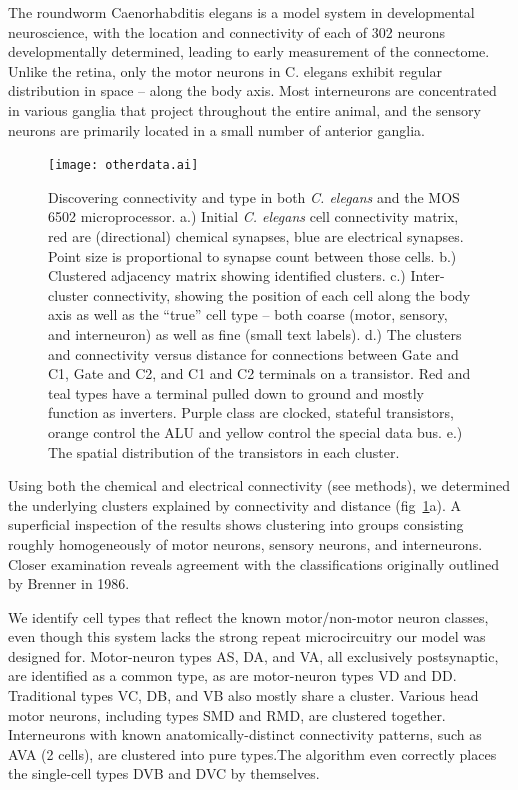 \documentclass{article}
\begin{document}
The roundworm Caenorhabditis elegans is a model system in
developmental neuroscience\autocite{White1986}, with the location and
connectivity of each of 302 neurons developmentally determined,
leading to early measurement of the connectome. Unlike the retina,
only the motor neurons in C. elegans exhibit regular distribution in
space -- along the body axis. Most interneurons are
concentrated in various ganglia that project throughout the entire
animal, and the sensory neurons are primarily located in a small
number of anterior ganglia.

\begin{figure}
  \centering 
  \centerline{\texttt{[image: otherdata.ai]}}
  \caption{Discovering connectivity and type in both
    \textit{C. elegans} and the MOS 6502 microprocessor.  a.) Initial
    \textit{C. elegans} cell connectivity matrix, red are
    (directional) chemical synapses, blue are electrical
    synapses. Point size is proportional to synapse count between
    those cells. b.) Clustered adjacency matrix showing identified
    clusters. c.) Inter-cluster connectivity, showing the position of
    each cell along the body axis as well as the ``true'' cell type --
    both coarse (motor, sensory, and interneuron) as well as fine
    (small text labels). d.) The clusters and connectivity versus
    distance for connections between Gate and C1, Gate and C2, and C1
    and C2 terminals on a transistor. Red and teal types have a
    terminal pulled down to ground and mostly function as
    inverters. Purple class are clocked, stateful transistors, orange
    control the ALU and yellow control the special data bus. e.) The
    spatial distribution of the transistors in each cluster.}
  \label{fig:otherdata}
\end{figure}

Using both the chemical and electrical connectivity (see methods), we
determined the underlying clusters explained by connectivity and
distance (fig~\ref{fig:otherdata}a). A superficial inspection of the results shows
clustering into groups consisting roughly homogeneously of motor
neurons, sensory neurons, and interneurons. Closer examination reveals
agreement with the classifications originally outlined by Brenner in
1986.  

We identify cell types that reflect the known motor/non-motor neuron
classes, even though this system lacks the strong repeat
microcircuitry our model was designed for.  Motor-neuron types AS, DA,
and VA, all exclusively postsynaptic, are identified as a common type,
as are motor-neuron types VD and DD. Traditional types VC, DB, and VB
also mostly share a cluster. Various head motor neurons, including
types SMD and RMD, are clustered together. Interneurons with known
anatomically-distinct connectivity patterns, such as AVA (2 cells),
are clustered into pure types.The algorithm even correctly places the
single-cell types DVB and DVC by themselves.
\end{document}
